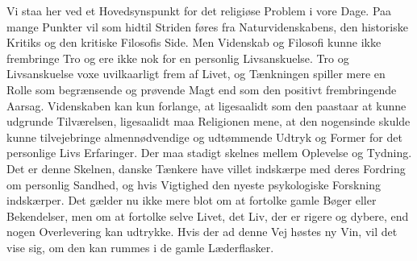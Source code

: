 \documentclass[12pt,a4paper]{article}
\newcommand{\opage}[1]{\marginnote{\footnotesize\textit{[#1]}}}
\begin{document}
Vi staa her ved et Hovedsynspunkt for det religiøse Problem i vore Dage. Paa
mange Punkter vil som hidtil Striden føres fra Naturvidenskabens, den historiske
Kritiks og den kritiske Filosofis Side. Men Videnskab og Filosofi kunne ikke
frembringe Tro og ere \opage{57} ikke nok for en personlig Livsanskuelse. Tro og
Livsanskuelse voxe uvilkaarligt frem af Livet, og Tænkningen spiller mere en
Rolle som begrænsende og prøvende Magt end som den positivt frembringende
Aarsag. Videnskaben kan kun forlange, at ligesaalidt som den paastaar at kunne
udgrunde Tilværelsen, ligesaalidt maa Religionen mene, at den nogensinde skulde
kunne tilvejebringe almennødvendige og udtømmende Udtryk og Former for det
personlige Livs Erfaringer. Der maa stadigt skelnes mellem Oplevelse og Tydning.
Det er denne Skelnen, danske Tænkere have villet indskærpe med deres Fordring om
personlig Sandhed, og hvis Vigtighed den nyeste psykologiske Forskning
indskærper. Det gælder nu ikke mere blot om at fortolke gamle Bøger eller
Bekendelser, men om at fortolke selve Livet, det Liv, der er rigere og dybere,
end nogen Overlevering kan udtrykke. Hvis der ad denne Vej høstes ny Vin, vil
det vise sig, om den kan rummes i de gamle Læderflasker.
\end{document}
